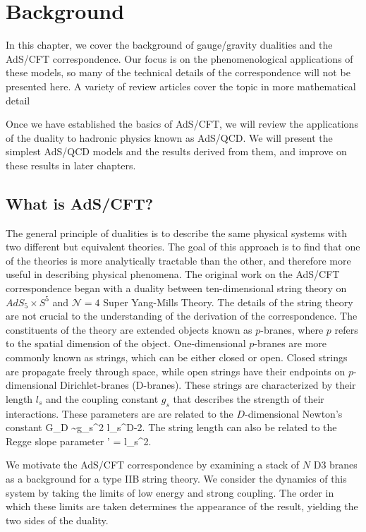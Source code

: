\chapter{Background}
\label{background}

In this chapter, we cover the background of gauge/gravity dualities and the AdS/CFT correspondence.
Our focus is on the phenomenological applications of these models, so many of the technical details of the correspondence will not be presented here.
A variety of review articles cover the topic in more mathematical detail

Once we have established the basics of AdS/CFT, we will review the applications of the  duality to hadronic physics known as AdS/QCD.
We will present the simplest AdS/QCD models and the results derived from them, and improve on these results in later chapters.

\section{What is AdS/CFT?}
The general principle of dualities is to describe the same physical systems with two different but equivalent theories. 
The goal of this approach is to find that one of the theories is more analytically tractable than the other, and therefore more useful in describing physical phenomena.
The original work on the AdS/CFT correspondence began with a duality between ten-dimensional string theory on $AdS_5 \times S^5$ and $\mathcal{N}=4 $ Super Yang-Mills Theory.
The details of the string theory are not crucial to the understanding of the derivation of the correspondence.
The constituents of the theory are extended objects known as $p$-branes, where $p$ refers to the spatial dimension of the object. 
One-dimensional $p$-branes are more commonly known as strings, which can be either closed or open.
Closed strings are propagate freely through space, while open strings have  their endpoints on $p$-dimensional Dirichlet-branes (D-branes). 
These strings are characterized by their length $l_s$ and the coupling constant $g_s$ that describes the strength of their interactions. 
These parameters are are related to the $D$-dimensional Newton's constant
\be
G_D \sim g_s^2 l_s^{D-2}.
\ee
The string length can also be related to the Regge slope parameter
\be
\alpha' = l_s^2.
\label{eq:ReggeSlope}
\ee

We motivate the AdS/CFT correspondence by examining a stack of $N$ D3 branes as a background for a type IIB string theory.
We consider the dynamics of this system by taking the limits of low energy and strong coupling. 
The order in which these limits are taken determines the appearance of the result, yielding the two sides of the duality.

